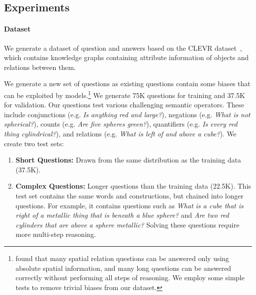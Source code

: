 \documentclass[main.tex]{subfiles}
\begin{document}

\subsection{Experiments}
\label{ssec:exp}

\paragraph{Dataset}
We generate a dataset of question and answers based on the \textsc{CLEVR} dataset~\cite{clevr-2017}, which contains knowledge graphs containing attribute information of objects and relations between them.

We generate a new set of questions as existing questions contain some biases that can be exploited by models.\footnote{
 found that many spatial relation questions can be answered only using absolute spatial information, and many long questions can be answered correctly without performing all steps of reasoning. We employ some simple tests to remove trivial biases from our dataset.}
We generate 75K questions for training and 37.5K for validation.
Our questions test various challenging semantic operators.
These include conjunctions (e.g. \emph{Is anything red and large?}), negations (e.g. \emph{What is not spherical?}), counts (e.g. \emph{Are five spheres green?}), quantifiers (e.g. \emph{Is every red thing cylindrical?}), and relations (e.g. \emph{What is left of and above a cube?}). We create two test sets:

\begin{enumerate}
\item
\textbf{Short Questions:}
Drawn from the same distribution as the training data (37.5K).

\item
\textbf{Complex Questions:}
Longer questions than the training data (22.5K). This test set contains the same words and constructions, but chained into longer questions.
For example, it contains questions such as \emph{What is a cube that is right of a metallic thing that is beneath a blue sphere?} and \emph{Are two red cylinders that are above a sphere metallic?}
Solving these questions require more multi-step reasoning.
\end{enumerate}
\end{document}
